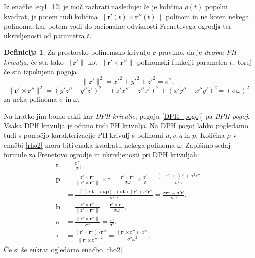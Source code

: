 \documentclass[12pt,a4paper,twoside]{article}
\theoremstyle{definition} %
\newtheorem{definicija}{Definicija}[section]
\theoremstyle{plain} %
\theoremstyle{primerstyle}
\numberwithin{equation}{section}  %
\newcommand{\tV}{\mathbf{t}}
\newcommand{\bV}{\mathbf{b}}
\newcommand{\pV}{\mathbf{p}}
\newcommand{\rV}{\mathbf{r}}
\begin{document}
Iz enačbe \eqref{eq4_12} je moč razbrati naslednje: če je količina $\rho(t)$ popolni kvadrat, je potem tudi količina $\lVert \rV'(t) \times \rV''(t) \rVert$ polinom in ne koren nekega polinoma, kar potem vodi do racionalne odvisnosti Frenetovega ogrodja ter ukrivljenosti od parametra $t.$
\begin{definicija}
	\label{dvojnaPH}
	Za prostorsko polinomsko krivuljo $\rV$ pravimo, da je \emph{dvojna PH krivulja,} če sta tako $\lVert \rV' \rVert$ kot $\lVert \rV' \times \rV'' \rVert$ polinomski funkciji parametra $t,$ torej če sta izpolnjena pogoja
	\begin{equation}
		\lVert \rV' \rVert^2=x'^2+y'^2+z'^2=\sigma^2,
	\end{equation}
	\begin{equation}
		\label{DPH_pogoj}
		\lVert \rV' \times \rV'' \rVert^2=(y'z''-y''z')^2+(z'x''-z''x')^2+(x'y''-x''y')^2=(\sigma \omega)^2
	\end{equation}
	za neka polinoma $\sigma$ in $\omega.$
\end{definicija}
Na kratko jim bomo rekli kar \emph{DPH krivulje}, pogoju \eqref{DPH_pogoj} pa \emph{DPH pogoj}. Vsaka DPH krivulja je očitno tudi PH krivulja. Na DPH pogoj lahko pogledamo tudi s pomočjo karakterizacije PH krivulj s polinomi $u,v,q$ in $p.$ Količina $\rho$ v enačbi \eqref{rho2} mora biti enaka kvadratu nekega polinoma $\omega.$ Zapišimo sedaj formule za Frenetovo ogrodje in ukrivljenosti pri DPH krivuljah:
\begin{align}
	\tV&=\frac{\rV'}{\sigma}, \nonumber \\
	\pV&=\frac{\rV'\times \rV''}{\lVert \rV'\times \rV'' \rVert} \times \tV =\frac{\rV'\times \rV''}{\sigma \omega}\times \frac{\rV'}{\sigma}=\frac{(-\rV'' \cdot \rV')\rV'+\sigma^2\rV''}{\sigma^2\omega} \nonumber \\
	&=\frac{-((\sigma'\tV+\sigma \kappa \pV)\cdot(\sigma\tV))\rV'+\sigma^2\rV''}{\sigma^2\omega}=\frac{\sigma\rV''-\sigma'\rV'}{\sigma\omega},\label{DPH_frenet_ukrv} \\
	\bV&=\frac{\rV'\times \rV''}{\lVert \rV'\times \rV'' \rVert}=\frac{\rV'\times \rV''}{\sigma\omega}, \nonumber \\
	\kappa &= \frac{\lVert \rV'\times \rV'' \rVert}{\sigma^3}=\frac{\omega}{\sigma^2}, \nonumber \\
	\tau &= \frac{(\rV'\times\rV'')\cdot\rV'''}{\lVert \rV'\times \rV'' \rVert^2}=\frac{(\rV'\times\rV'')\cdot\rV'''}{\sigma^2\omega^2}.\nonumber
\end{align}
Če si še enkrat ogledamo enačbo \eqref{rho2}
\end{document}
